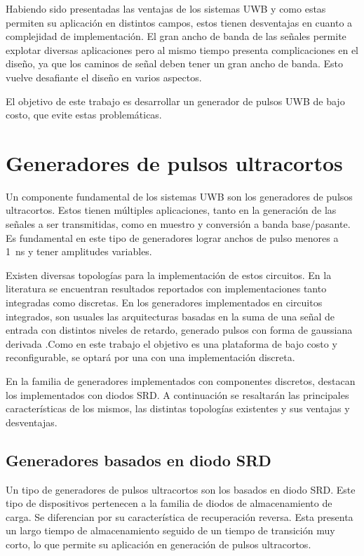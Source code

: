 Habiendo sido presentadas las ventajas de los sistemas UWB y como estas permiten
su aplicación en distintos campos, estos tienen desventajas en cuanto a
complejidad de implementación. El gran ancho de banda de las señales permite
explotar diversas aplicaciones pero al mismo tiempo presenta complicaciones en
el diseño, ya que los caminos de señal deben tener un gran ancho de banda. Esto
vuelve desafiante el diseño en varios aspectos.

El objetivo de este trabajo es desarrollar un generador de pulsos UWB de bajo
costo, que evite estas problemáticas.

\section{Generadores de pulsos ultracortos}

Un componente fundamental de los sistemas UWB son los generadores de pulsos
ultracortos. Estos tienen múltiples aplicaciones, tanto en la generación de las
señales a ser transmitidas, como en muestro y conversión a banda
base/pasante. Es fundamental en este tipo de generadores lograr anchos de pulso
menores a \qty{1}{\nano\second} y tener amplitudes variables.

Existen diversas topologías para la implementación de estos circuitos. En la
literatura se encuentran resultados reportados con implementaciones tanto
integradas como discretas. En los generadores implementados en circuitos
integrados, son usuales las arquitecturas basadas en la suma de una señal de
entrada con distintos niveles de retardo, generado pulsos con forma de gaussiana
derivada \cite{Nguyen2012} \cite{Salehi2010} \cite{An2018}.Como en este trabajo
el objetivo es una plataforma de bajo costo y reconfigurable, se optará por una
con una implementación discreta.

En la familia de generadores implementados con componentes discretos, destacan
los implementados con diodos SRD. A continuación se resaltarán las principales
características de los mismos, las distintas topologías existentes y sus
ventajas y desventajas.

\subsection{Generadores basados en diodo SRD}

Un tipo de generadores de pulsos ultracortos son los basados en diodo SRD. Este
tipo de dispositivos pertenecen a la familia de diodos de almacenamiento de
carga. Se diferencian por su característica de recuperación reversa. Esta
presenta un largo tiempo de almacenamiento seguido de un tiempo de transición
muy corto, lo que permite su aplicación en generación de pulsos ultracortos.

